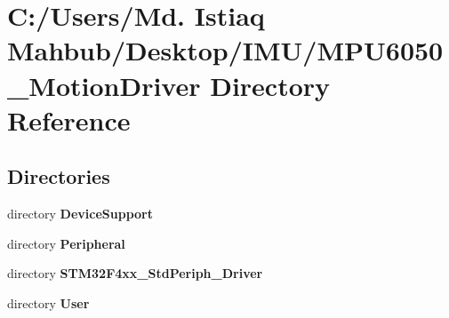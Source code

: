 \section{C\+:/\+Users/\+Md. Istiaq Mahbub/\+Desktop/\+I\+M\+U/\+M\+P\+U6050\+\_\+\+Motion\+Driver Directory Reference}
\label{dir_e6669bd28ac7237d58057fefd5a265ab}
\subsection*{Directories}
\begin{DoxyCompactItemize}
\item 
directory \textbf{ Device\+Support}
\item 
directory \textbf{ Peripheral}
\item 
directory \textbf{ S\+T\+M32\+F4xx\+\_\+\+Std\+Periph\+\_\+\+Driver}
\item 
directory \textbf{ User}
\end{DoxyCompactItemize}
